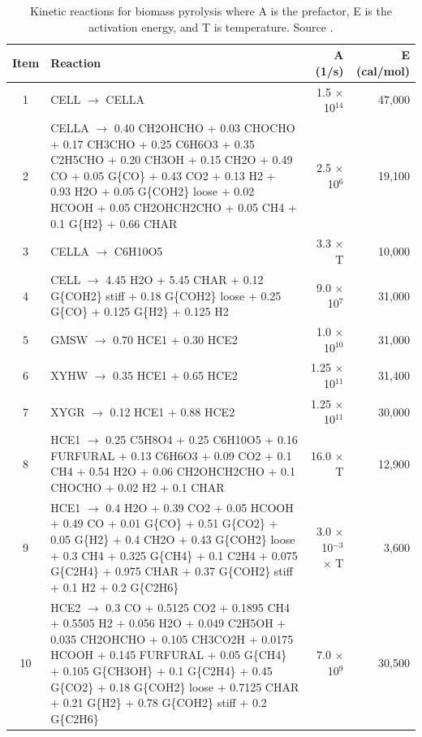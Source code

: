 \begin{center}
\footnotesize
\begin{longtable}{cp{4in}rr}
    \caption{Kinetic reactions for biomass pyrolysis where A is the prefactor, E is the activation energy, and T is temperature. Source \cite{Debiagi-2018}.}
    \label{tab:chem-kinetics} \\
    \toprule
    Item & Reaction & A (1/s) & E (cal/mol) \\
    \midrule
    1  & CELL $\rightarrow$ CELLA & 1.5 $\times$ 10$^{14}$ & 47,000 \\
    2  & CELLA $\rightarrow$ 0.40 CH2OHCHO + 0.03 CHOCHO + 0.17 CH3CHO + 0.25 C6H6O3 + 0.35 C2H5CHO + 0.20 CH3OH + 0.15 CH2O + 0.49 CO + 0.05 G\{CO\} + 0.43 CO2 + 0.13 H2 + 0.93 H2O + 0.05 G\{COH2\} loose + 0.02 HCOOH + 0.05 CH2OHCH2CHO + 0.05 CH4 + 0.1 G\{H2\} + 0.66 CHAR & 2.5 $\times$ 10$^6$ & 19,100 \\
    3  & CELLA $\rightarrow$ C6H10O5 & 3.3 $\times$ T & 10,000 \\
    4  & CELL $\rightarrow$ 4.45 H2O + 5.45 CHAR + 0.12 G\{COH2\} stiff + 0.18 G\{COH2\} loose + 0.25 G\{CO\} + 0.125 G\{H2\} + 0.125 H2 & 9.0 $\times$ 10$^7$ & 31,000 \\
    5  & GMSW $\rightarrow$ 0.70 HCE1 + 0.30 HCE2 & 1.0 $\times$ 10$^{10}$ & 31,000 \\
    6  & XYHW $\rightarrow$ 0.35 HCE1 + 0.65 HCE2 & 1.25 $\times$ 10$^{11}$ & 31,400 \\
    7  & XYGR $\rightarrow$ 0.12 HCE1 + 0.88 HCE2 & 1.25 $\times$ 10$^{11}$ & 30,000 \\
    8  & HCE1 $\rightarrow$ 0.25 C5H8O4 + 0.25 C6H10O5 + 0.16 FURFURAL + 0.13 C6H6O3 + 0.09 CO2 + 0.1 CH4 + 0.54 H2O + 0.06 CH2OHCH2CHO + 0.1 CHOCHO + 0.02 H2 + 0.1 CHAR & 16.0 $\times$ T & 12,900 \\
    9  & HCE1 $\rightarrow$ 0.4 H2O + 0.39 CO2 + 0.05 HCOOH + 0.49 CO + 0.01 G\{CO\} + 0.51 G\{CO2\} + 0.05 G\{H2\} + 0.4 CH2O + 0.43 G\{COH2\} loose + 0.3 CH4 + 0.325 G\{CH4\} + 0.1 C2H4 + 0.075 G\{C2H4\} + 0.975 CHAR + 0.37 G\{COH2\} stiff + 0.1 H2 + 0.2 G\{C2H6\} & 3.0 $\times$ 10$^{-3}$ $\times$ T & 3,600 \\
    10 & HCE2 $\rightarrow$ 0.3 CO + 0.5125 CO2 + 0.1895 CH4 + 0.5505 H2 + 0.056 H2O + 0.049 C2H5OH + 0.035 CH2OHCHO + 0.105 CH3CO2H + 0.0175 HCOOH + 0.145 FURFURAL + 0.05 G\{CH4\} + 0.105 G\{CH3OH\} + 0.1 G\{C2H4\} + 0.45 G\{CO2\} + 0.18 G\{COH2\} loose + 0.7125 CHAR + 0.21 G\{H2\} + 0.78 G\{COH2\} stiff + 0.2 G\{C2H6\} & 7.0 $\times$ 10$^9$ & 30,500 \\

\end{longtable}
\end{center}
